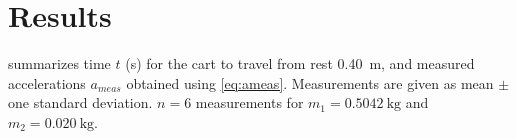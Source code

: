 \documentclass[reprint,amsmath,amssymb,aps]{revtex4-2}
\begin{document}







\section{Results}
 summarizes time $t$ (\unit{\second}) for the cart to travel from rest \qty{0.40}{\meter}, and measured accelerations $a_{meas}$ obtained using \cref{eq:ameas}. Measurements are given as mean $\pm$ one standard deviation. $n=6$ measurements for $m_1=\qty{0.5042}{\kilo\gram}$ and $m_2=\qty{0.020}{\kilo\gram}$.


\end{document}
